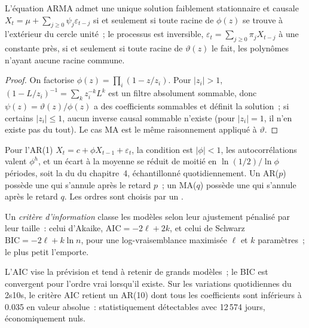 \begin{proposition}\label{prop:qm:linear-time-series:roots}
L'équation ARMA admet une unique solution faiblement stationnaire et causale $X_t = \mu + \sum_{j \ge 0}\psi_j\varepsilon_{t-j}$ si et seulement si toute racine de $\phi(z)$
se trouve à l'extérieur du cercle unité~; le processus est inversible, $\varepsilon_t = \sum_{j \ge 0}\pi_jX_{t-j}$ à une constante près, si et seulement si toute racine de $\vartheta(z)$
le fait, les polynômes n'ayant aucune racine commune.
\end{proposition}

\begin{proof}
On factorise $\phi(z) = \prod_i(1 - z/z_i)$. Pour $|z_i| > 1$, $(1 - L/z_i)^{-1} = \sum_kz_i^{-k}L^k$ est un filtre absolument sommable, donc $\psi(z) = \vartheta(z)/\phi(z)$
a des coefficients sommables et définit la solution~; si certains $|z_i| \le 1$, aucun inverse causal sommable n'existe (pour $|z_i| = 1$, il n'en existe pas du tout). Le cas MA
est le même raisonnement appliqué à $\vartheta$.
\end{proof}

Pour l'AR(1) $X_t = c + \phi X_{t-1} + \varepsilon_t$, la condition est $|\phi| < 1$, les autocorrélations valent $\phi^h$, et un écart à la moyenne
se réduit de moitié en $\ln(1/2)/\ln\phi$ périodes, soit la  du  du chapitre~4, échantillonné quotidiennement. Un AR($p$) possède une  qui s'annule après le retard $p$~; un MA($q$) possède une  qui s'annule après le retard $q$. Les ordres sont
choisis par un .

\begin{definition}\label{def:qm:linear-time-series:ic}
Un \emph{critère d'information} classe les modèles selon leur ajustement pénalisé par leur taille~: celui d'Akaike, $\mathrm{AIC} = -2\ell + 2k$, et celui de Schwarz
$\mathrm{BIC} = -2\ell + k\ln n$, pour une log-vraisemblance maximisée $\ell$ et $k$ paramètres~; le plus petit l'emporte.
\end{definition}

L'AIC vise la prévision et tend à retenir de grands modèles~; le BIC est convergent pour l'ordre vrai lorsqu'il existe. Sur les variations quotidiennes du 2s10s, le critère AIC
retient un AR(10) dont tous les coefficients sont inférieurs à 0.035 en valeur absolue~: statistiquement détectables avec 12\,574 jours, économiquement nuls.

